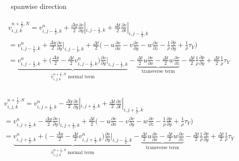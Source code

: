 \documentclass{article}
\numberwithin{equation}{subsection}
\begin{document}
\begin{figure}[!htb]
\centering
{}
\caption{spanwise direction}
\end{figure}

\begin{align}
\begin{split}
& v_{i,j,k}^{n+\frac{1}{2},N} = v_{i,j-\frac{1}{2},k}^n + \frac{\Delta y}{2}\frac{\partial v}{\partial y}|_{i,j-\frac{1}{2},k} + \frac{\Delta t}{2}\frac{\partial v}{\partial t}|_{i,j-\frac{1}{2},k}\\
&= v_{i,j-\frac{1}{2},k}^n + \frac{\Delta y}{2} \frac{\partial v}{\partial y}|_{i,j-\frac{1}{2},k} + \frac{\Delta t}{2} \Big( -u\frac{\partial v}{\partial x} -v\frac{\partial v}{\partial y} -w\frac{\partial v}{\partial z} - \frac{1}{\rho}\frac{\partial p}{\partial y} + \frac{1}{\rho}\tau_Y\Big) \\
&= \underbrace{v_{i,j-\frac{1}{2},k}^n + \Big(\frac{\Delta y}{2} - \frac{\Delta t}{2} v_{i,j-\frac{1}{2},k}^n\Big)\frac{\partial v}{\partial y}|_{i,j-\frac{1}{2},k}}_\text{$\widehat{v}_{i,j,k}^{n+\frac{1}{2},N}$ normal term} -\underbrace{\frac{\Delta t}{2}u\frac{\partial v}{\partial x} - \frac{\Delta t}{2}w\frac{\partial v}{\partial z}}_\text{transverse term} - \frac{\Delta t}{2}\frac{1}{\rho}\frac{\partial p}{\partial y} + \frac{\Delta t}{2}\frac{1}{\rho}\tau_Y \\
\end{split}
\end{align}

\begin{align}
\begin{split}
& v_{i,j,k}^{n+\frac{1}{2},S} = v_{i,j+\frac{1}{2},k}^n - \frac{\Delta y}{2}\frac{\partial v}{\partial y}|_{i,j+\frac{1}{2},k} + \frac{\Delta t}{2}\frac{\partial v}{\partial t}|_{i,j+\frac{1}{2},k}\\
&= v_{i,j+\frac{1}{2},k}^n - \frac{\Delta y}{2} \frac{\partial v}{\partial y}|_{i,j+\frac{1}{2},k} + \frac{\Delta t}{2} \Big( -u\frac{\partial v}{\partial x} -v\frac{\partial v}{\partial y} -w\frac{\partial v}{\partial z} - \frac{1}{\rho}\frac{\partial p}{\partial y} + \frac{1}{\rho}\tau_Y\Big) \\
&= \underbrace{v_{i,j+\frac{1}{2},k}^n + \Big(-\frac{\Delta y}{2} - \frac{\Delta t}{2} v_{i,j+\frac{1}{2},k}^n\Big)\frac{\partial v}{\partial y}|_{i,j-\frac{1}{2},k}}_\text{$\widehat{v}_{i,j,k}^{n+\frac{1}{2},S}$ normal term} -\underbrace{\frac{\Delta t}{2}u\frac{\partial v}{\partial x} - \frac{\Delta t}{2}w\frac{\partial v}{\partial z}}_\text{transverse term} - \frac{\Delta t}{2}\frac{1}{\rho}\frac{\partial p}{\partial y} + \frac{\Delta t}{2}\frac{1}{\rho}\tau_Y \\
\end{split}
\end{align}
\end{document}
